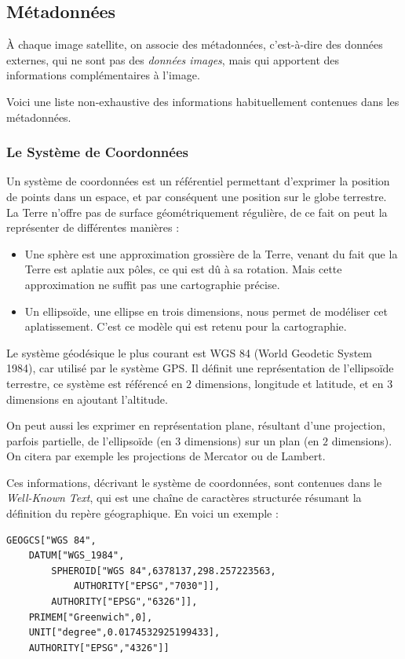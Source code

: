 \documentclass[a4paper, 11pt]{report}
\begin{document}
\subsection{Métadonnées}
À chaque image satellite, on associe des métadonnées, c'est-à-dire des données externes, qui ne sont pas des \emph{données images}, mais qui apportent des informations complémentaires à l'image.

Voici une liste non-exhaustive des informations habituellement contenues dans les métadonnées.
\subsubsection{Le Système de Coordonnées}
Un système de coordonnées est un référentiel permettant d'exprimer la position de points dans un espace, et par conséquent une position sur le globe terrestre.
La Terre n'offre pas de surface géométriquement régulière, de ce fait on peut la représenter de différentes manières :
\begin{itemize}
	\item Une sphère est une approximation grossière de la Terre, venant du fait que la Terre est aplatie aux pôles, ce qui est dû à sa rotation. Mais cette approximation ne suffit pas une cartographie précise.
	\item Un ellipsoïde, une ellipse en trois dimensions, nous permet de modéliser cet aplatissement. C'est ce modèle qui est retenu pour la cartographie.
\end{itemize}

Le système géodésique le plus courant est WGS 84 (World Geodetic System 1984), car utilisé par le système GPS. Il définit une représentation de l'ellipsoïde terrestre, ce système est référencé en $2$ dimensions, longitude et latitude, et en $3$ dimensions en ajoutant l'altitude.

On peut aussi les exprimer en représentation plane, résultant d'une projection, parfois partielle, de l'ellipsoïde (en $3$ dimensions) sur un plan (en $2$ dimensions). On citera par exemple les projections de Mercator ou de Lambert.

Ces informations, décrivant le système de coordonnées, sont contenues dans le \emph{Well-Known Text}, qui est une chaîne de caractères structurée résumant la définition du repère géographique. En voici un exemple :

\begin{verbatim}
GEOGCS["WGS 84",
    DATUM["WGS_1984",
        SPHEROID["WGS 84",6378137,298.257223563,
            AUTHORITY["EPSG","7030"]],
        AUTHORITY["EPSG","6326"]],
    PRIMEM["Greenwich",0],
    UNIT["degree",0.0174532925199433],
    AUTHORITY["EPSG","4326"]]
\end{verbatim}
\end{document}
